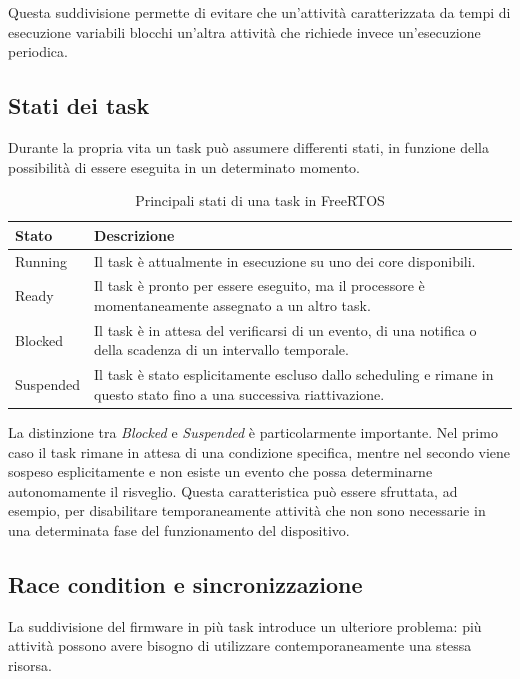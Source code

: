 Questa suddivisione permette di evitare che un'attività caratterizzata da
tempi di esecuzione variabili blocchi un'altra attività che richiede invece
un'esecuzione periodica.

\subsection{Stati dei task}
Durante la propria vita un task può assumere differenti stati, in funzione
della possibilità di essere eseguita in un determinato momento.

\begin{table}[H]
    \centering
    \begin{tabular}{lp{9cm}}
        \hline
        \textbf{Stato} & \textbf{Descrizione} \\
        \hline
        Running & Il task è attualmente in esecuzione su uno dei core disponibili. \\ \hline
        Ready & Il task è pronto per essere eseguito, ma il processore è momentaneamente assegnato a un altro task. \\ \hline
        Blocked & Il task è in attesa del verificarsi di un evento, di una notifica o della scadenza di un intervallo temporale. \\ \hline
        Suspended & Il task è stato esplicitamente escluso dallo scheduling e rimane in questo stato fino a una successiva riattivazione. \\ \hline
    \end{tabular}
    \caption{Principali stati di una task in FreeRTOS}
    \label{tab:freertos-states}
\end{table}

La distinzione tra \textit{Blocked} e \textit{Suspended} è particolarmente
importante. Nel primo caso il task rimane in attesa di una condizione
specifica, mentre nel secondo viene sospeso esplicitamente e non esiste
un evento che possa determinarne autonomamente il risveglio.
Questa caratteristica può essere sfruttata, ad esempio, per disabilitare
temporaneamente attività che non sono necessarie in una determinata fase
del funzionamento del dispositivo.

\subsection{Race condition e sincronizzazione}
La suddivisione del firmware in più task introduce un ulteriore problema:
più attività possono avere bisogno di utilizzare contemporaneamente una
stessa risorsa.

